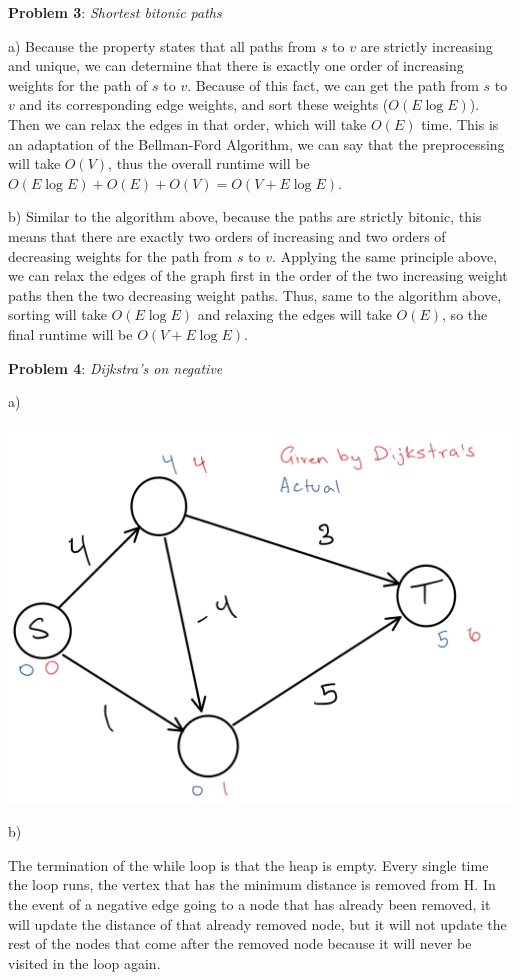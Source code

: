 \documentclass{article} %
\newcommand{\question}[2][]{\begin{flushleft}
        \textbf{Problem #1}: \textit{#2}

\end{flushleft}}
\begin{document}
    \newpage

    \question[3]{Shortest bitonic paths}

    a) Because the property states that all paths from $s$ to $v$ are strictly increasing and unique, we can determine that there is exactly one order of increasing weights for the path of $s$ to $v$. Because of this fact, we can get the path from $s$ to $v$ and its corresponding edge weights, and sort these weights ($O(E \log E)$). Then we can relax the edges in that order, which will take $O(E)$ time. This is an adaptation of the Bellman-Ford Algorithm, we can say that the preprocessing will take $O(V)$, thus the overall runtime will be $O(E \log E) + O(E) + O(V) = O(V + E \log E)$.

    b) Similar to the algorithm above, because the paths are strictly bitonic, this means that there are exactly two orders of increasing and two orders of decreasing weights for the path from $s$ to $v$. Applying the same principle above, we can relax the edges of the graph first in the order of the two increasing weight paths then the two decreasing weight paths. Thus, same to the algorithm above, sorting will take $O(E \log E)$ and relaxing the edges will take $O(E)$, so the final runtime will be $O(V + E \log E)$.


    
    \newpage

    \question[4]{Dijkstra's on negative}

    a)

    \includegraphics[scale=0.2]{s.jpeg}

    b)

    The termination of the while loop is that the heap is empty. Every single time the loop runs, the vertex that has the minimum distance is removed from H. In the event of a negative edge going to a node that has already been removed, it will update the distance of that already removed node, but it will not update the rest of the nodes that come after the removed node because it will never be visited in the loop again.
\end{document}
